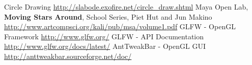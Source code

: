 \begin{thebibliography}{1}
Circle Drawing \url{http://slabode.exofire.net/circle_draw.shtml}
Maya Open Lab, \textbf{Moving Stars Around}, School Series, Piet Hut and Jun Makino \url{http://www.artcompsci.org/kali/pub/msa/volume1.pdf}
GLFW - OpenGL Framework \url{http://www.glfw.org/}
GLFW - API Documentation \url{http://www.glfw.org/docs/latest/}
AntTweakBar - OpenGL GUI \url{http://anttweakbar.sourceforge.net/doc/}
\end{thebibliography}
